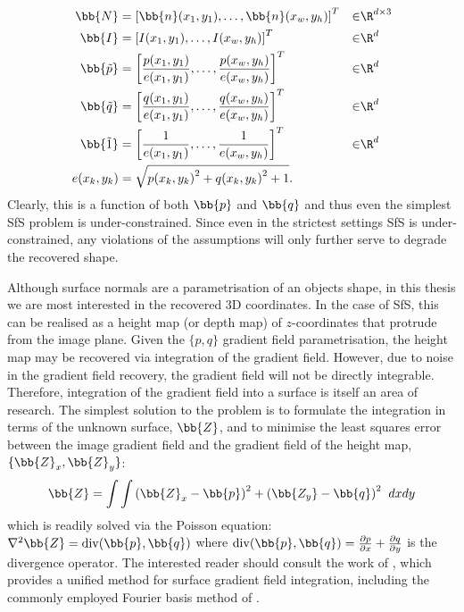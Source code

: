 \begin{align*}
    \bb{N} &= {[\bb{n}(x_1, y_1), \ldots, \bb{n}(x_w, y_h)]}^T &\in &\R^{d \times 3} \\
	\bb{I} &= {[I(x_1, y_1), \ldots, I(x_w, y_h)]}^T &\in &\R^{d} \\
	\bb{\tilde{p}} &= {\left[\frac{p(x_1, y_1)}{e(x_1, y_1)}, \ldots, \frac{p(x_w, y_h)}{e(x_w, y_h)}\right]}^T &\in &\R^{d} \\
	\bb{\tilde{q}} &= {\left[\frac{q(x_1, y_1)}{e(x_1, y_1)}, \ldots, \frac{q(x_w, y_h)}{e(x_w, y_h)}\right]}^T &\in &\R^{d} \\
 	\bb{\tilde{1}} &= {\left[\frac{1}{e(x_1, y_1)}, \ldots, \frac{1}{e(x_w, y_h)}\right]}^T &\in &\R^{d} \\
	e(x_k, y_k) &= \sqrt{{p(x_k, y_k)}^2 + {q(x_k, y_k)}^2 + 1}. & &
\end{align*}
Clearly, this is a function of both $\bb{p}$ and $\bb{q}$ and thus even
the simplest SfS problem is under-constrained. Since
even in the strictest settings SfS is under-constrained, any violations
of the assumptions will only further serve to degrade the recovered shape.

Although surface normals
are a parametrisation of an objects shape, in this thesis we are most
interested in the recovered 3D coordinates. In the case of SfS, this can be
realised as a height map (or depth map) of $z$-coordinates that protrude
from the image plane. Given the $\{p, q\}$ gradient field parametrisation, the
height map may be recovered via integration of the gradient field. However,
due to noise in the gradient field recovery, the gradient field will not be
directly integrable. Therefore, integration of the gradient field into a
surface is itself an area of research. The simplest solution to the
problem is to formulate the integration in terms of the unknown surface,
$\bb{Z}$, and to minimise the least squares error~\cite{horn1990height,simchony1990direct,agrawal2006range}
between the image gradient field and the gradient field of the height map,
$\{\bb{Z}_x, \bb{Z}_y\}$:
\begin{equation}\label{eq:bg_sfs_gradient_field_ls}
    \bb{Z} = \int \int {(\bb{Z}_x - \bb{p})}^2 + {(\bb{Z_y} - \bb{q})}^2 \;\; dx dy
\end{equation}
which is readily solved via the Poisson equation:
$\nabla^2 \bb{Z} = \operatorname{div}(\bb{p}, \bb{q})$ where
$\operatorname{div}(\bb{p}, \bb{q}) = \frac{\partial p}{\partial x} + \frac{\partial q}{\partial y}$
is the divergence operator. The interested reader should consult the
work of \citet{agrawal2006range}, which provides a unified method for
surface gradient field integration, including the commonly employed Fourier
basis method of \citet{frankot1988method}.

